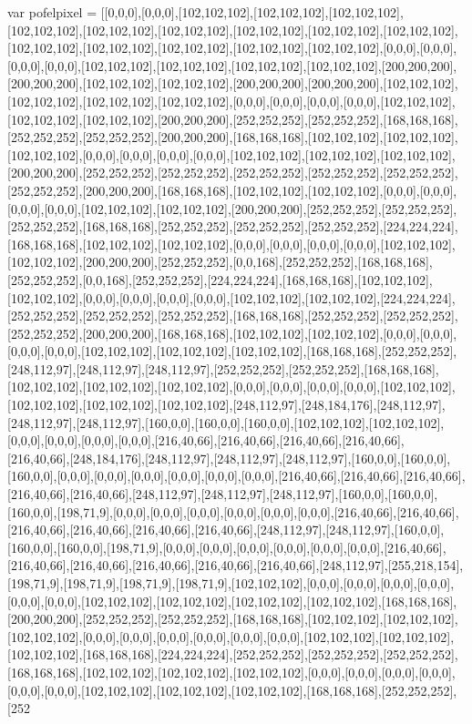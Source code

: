 var pofelpixel = [[0,0,0],[0,0,0],[102,102,102],[102,102,102],[102,102,102],[102,102,102],[102,102,102],[102,102,102],[102,102,102],[102,102,102],[102,102,102],[102,102,102],[102,102,102],[102,102,102],[102,102,102],[102,102,102],[0,0,0],[0,0,0],[0,0,0],[0,0,0],[102,102,102],[102,102,102],[102,102,102],[102,102,102],[200,200,200],[200,200,200],[102,102,102],[102,102,102],[200,200,200],[200,200,200],[102,102,102],[102,102,102],[102,102,102],[102,102,102],[0,0,0],[0,0,0],[0,0,0],[0,0,0],[102,102,102],[102,102,102],[102,102,102],[200,200,200],[252,252,252],[252,252,252],[168,168,168],[252,252,252],[252,252,252],[200,200,200],[168,168,168],[102,102,102],[102,102,102],[102,102,102],[0,0,0],[0,0,0],[0,0,0],[0,0,0],[102,102,102],[102,102,102],[102,102,102],[200,200,200],[252,252,252],[252,252,252],[252,252,252],[252,252,252],[252,252,252],[252,252,252],[200,200,200],[168,168,168],[102,102,102],[102,102,102],[0,0,0],[0,0,0],[0,0,0],[0,0,0],[102,102,102],[102,102,102],[200,200,200],[252,252,252],[252,252,252],[252,252,252],[168,168,168],[252,252,252],[252,252,252],[252,252,252],[224,224,224],[168,168,168],[102,102,102],[102,102,102],[0,0,0],[0,0,0],[0,0,0],[0,0,0],[102,102,102],[102,102,102],[200,200,200],[252,252,252],[0,0,168],[252,252,252],[168,168,168],[252,252,252],[0,0,168],[252,252,252],[224,224,224],[168,168,168],[102,102,102],[102,102,102],[0,0,0],[0,0,0],[0,0,0],[0,0,0],[102,102,102],[102,102,102],[224,224,224],[252,252,252],[252,252,252],[252,252,252],[168,168,168],[252,252,252],[252,252,252],[252,252,252],[200,200,200],[168,168,168],[102,102,102],[102,102,102],[0,0,0],[0,0,0],[0,0,0],[0,0,0],[102,102,102],[102,102,102],[102,102,102],[168,168,168],[252,252,252],[248,112,97],[248,112,97],[248,112,97],[252,252,252],[252,252,252],[168,168,168],[102,102,102],[102,102,102],[102,102,102],[0,0,0],[0,0,0],[0,0,0],[0,0,0],[102,102,102],[102,102,102],[102,102,102],[102,102,102],[248,112,97],[248,184,176],[248,112,97],[248,112,97],[248,112,97],[160,0,0],[160,0,0],[160,0,0],[102,102,102],[102,102,102],[0,0,0],[0,0,0],[0,0,0],[0,0,0],[216,40,66],[216,40,66],[216,40,66],[216,40,66],[216,40,66],[248,184,176],[248,112,97],[248,112,97],[248,112,97],[160,0,0],[160,0,0],[160,0,0],[0,0,0],[0,0,0],[0,0,0],[0,0,0],[0,0,0],[0,0,0],[216,40,66],[216,40,66],[216,40,66],[216,40,66],[216,40,66],[248,112,97],[248,112,97],[248,112,97],[160,0,0],[160,0,0],[160,0,0],[198,71,9],[0,0,0],[0,0,0],[0,0,0],[0,0,0],[0,0,0],[0,0,0],[216,40,66],[216,40,66],[216,40,66],[216,40,66],[216,40,66],[216,40,66],[248,112,97],[248,112,97],[160,0,0],[160,0,0],[160,0,0],[198,71,9],[0,0,0],[0,0,0],[0,0,0],[0,0,0],[0,0,0],[0,0,0],[216,40,66],[216,40,66],[216,40,66],[216,40,66],[216,40,66],[216,40,66],[248,112,97],[255,218,154],[198,71,9],[198,71,9],[198,71,9],[198,71,9],[102,102,102],[0,0,0],[0,0,0],[0,0,0],[0,0,0],[0,0,0],[0,0,0],[102,102,102],[102,102,102],[102,102,102],[102,102,102],[168,168,168],[200,200,200],[252,252,252],[252,252,252],[168,168,168],[102,102,102],[102,102,102],[102,102,102],[0,0,0],[0,0,0],[0,0,0],[0,0,0],[0,0,0],[0,0,0],[102,102,102],[102,102,102],[102,102,102],[168,168,168],[224,224,224],[252,252,252],[252,252,252],[252,252,252],[168,168,168],[102,102,102],[102,102,102],[102,102,102],[0,0,0],[0,0,0],[0,0,0],[0,0,0],[0,0,0],[0,0,0],[102,102,102],[102,102,102],[102,102,102],[168,168,168],[252,252,252],[252
